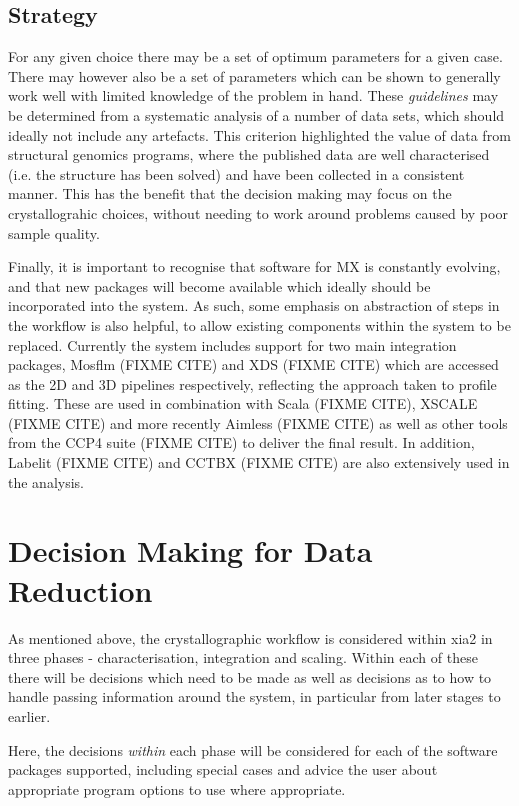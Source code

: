\documentclass[a4paper,11pt]{article}
\begin{document}
\subsection{Strategy}

For any given choice there may be a set of optimum parameters for a
given case. There may however also be a set of parameters which can be
shown to generally work well with limited knowledge of the problem in
hand. These \emph{guidelines} may be determined from a systematic
analysis of a number of data sets, which should ideally not include
any artefacts. This criterion highlighted the value of data from
structural genomics programs, where the published data are well
characterised (i.e. the structure has been solved) and have been
collected in a consistent manner. This has the benefit that the
decision making may focus on the crystallograhic choices, without
needing to work around problems caused by poor sample quality. 

Finally, it is important to recognise that software for MX is
constantly evolving, and that new packages will become available which
ideally should be incorporated into the system. As such, some emphasis
on abstraction of steps in the workflow is also helpful, to allow
existing components within the system to be replaced. Currently the
system includes support for two main integration packages, Mosflm
(FIXME CITE) and XDS (FIXME CITE) which are accessed as the 2D and 3D
pipelines respectively, reflecting the approach taken to profile
fitting. These are used in combination with Scala (FIXME CITE), XSCALE
(FIXME CITE) and more recently Aimless (FIXME CITE) as well as other
tools from the CCP4 suite (FIXME CITE) to deliver the final result. In
addition, Labelit (FIXME CITE) and CCTBX (FIXME CITE) are also
extensively used in the analysis.

\section{Decision Making for Data Reduction}

As mentioned above, the crystallographic workflow is considered within
xia2 in three phases - characterisation, integration and
scaling. Within each of these there will be decisions which need to be
made as well as decisions as to how to handle passing information
around the system, in particular from later stages to earlier. 

Here, the decisions \emph{within} each phase will be considered for
each of the software packages supported, including special cases and
advice the user about appropriate program options to use where
appropriate.
\end{document}
